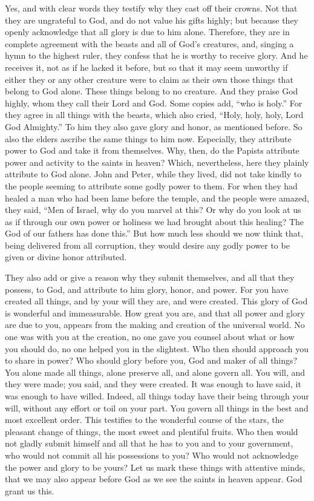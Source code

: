 Yes, and with clear words they testify why they cast off their crowns. Not that they are ungrateful to God, and do not value his gifts highly; but because they openly acknowledge that all glory is due to him alone. Therefore, they are in complete agreement with the beasts and all of God’s creatures, and, singing a hymn to the highest ruler, they confess that he is worthy to receive glory. And he receives it, not as if he lacked it before, but so that it may seem unworthy if either they or any other creature were to claim as their own those things that belong to God alone. These things belong to no creature. And they praise God highly, whom they call their Lord and God. Some copies add, “who is holy.” For they agree in all things with the beasts, which also cried, “Holy, holy, holy, Lord God Almighty.” To him they also gave glory and honor, as mentioned before. So also the elders ascribe the same things to him now. Especially, they attribute power to God and take it from themselves. Why, then, do the Papists attribute power and activity to the saints in heaven? Which, nevertheless, here they plainly attribute to God alone. John and Peter, while they lived, did not take kindly to the people seeming to attribute some godly power to them. For when they had healed a man who had been lame before the temple, and the people were amazed, they said, “Men of Israel, why do you marvel at this? Or why do you look at us as if through our own power or holiness we had brought about this healing? The God of our fathers has done this.” But how much less should we now think that, being delivered from all corruption, they would desire any godly power to be given or divine honor attributed.

They also add or give a reason why they submit themselves, and all that they possess, to God, and attribute to him glory, honor, and power. For you have created all things, and by your will they are, and were created. This glory of God is wonderful and immeasurable. How great you are, and that all power and glory are due to you, appears from the making and creation of the universal world. No one was with you at the creation, no one gave you counsel about what or how you should do, no one helped you in the slightest. Who then should approach you to share in power? Who should glory before you, God and maker of all things? You alone made all things, alone preserve all, and alone govern all. You will, and they were made; you said, and they were created. It was enough to have said, it was enough to have willed. Indeed, all things today have their being through your will, without any effort or toil on your part. You govern all things in the best and most excellent order. This testifies to the wonderful course of the stars, the pleasant change of things, the most sweet and plentiful fruits. Who then would not gladly submit himself and all that he has to you and to your government, who would not commit all his possessions to you? Who would not acknowledge the power and glory to be yours? Let us mark these things with attentive minds, that we may also appear before God as we see the saints in heaven appear. God grant us this.
